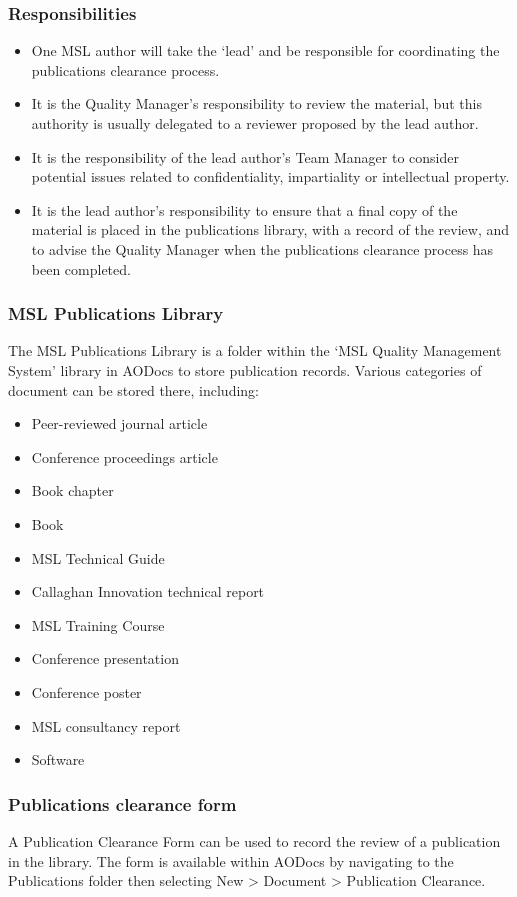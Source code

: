 \subsubsection{Responsibilities}
\begin{itemize}
\item  One MSL author will take the `lead' and be responsible for coordinating the publications clearance process.
\item  It is the Quality Manager's responsibility to review the material, but this authority is usually delegated to a reviewer proposed by the lead author.
\item  It is the responsibility of the lead author's Team Manager to consider potential issues related to confidentiality, impartiality or intellectual property.
\item  It is the lead author's responsibility to ensure that a final copy of the material is placed in the publications library, with a record of the review, and to advise the Quality Manager when the publications clearance process has been completed.
\end{itemize}

\subsubsection{MSL Publications Library}
 \label{sss:publications_repository}
The MSL Publications Library is a folder within the `MSL Quality Management System' library in AODocs to store publication records. Various categories of document can be stored there, including: 
\begin{itemize}
 \item Peer-reviewed journal article
 \item Conference proceedings article 
 \item Book chapter
 \item Book
 \item MSL Technical Guide
 \item Callaghan Innovation technical report 
 \item MSL Training Course 
 \item Conference presentation 
 \item Conference poster
 \item MSL consultancy report
 \item Software
\end{itemize}

\subsubsection{Publications clearance form}
A Publication Clearance Form can be used to record the review of a publication in the library. The form is available within AODocs by navigating to the Publications folder then selecting New > Document > Publication Clearance.

